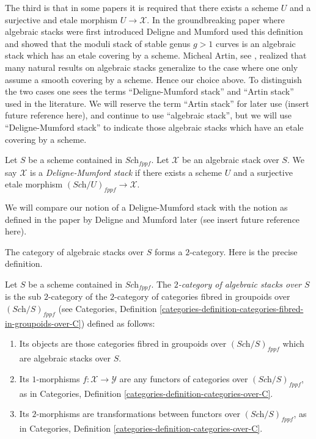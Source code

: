 \medskip\noindent
The third is that in some papers it is required that there exists a
scheme $U$ and a surjective and etale morphism $U \to \mathcal{X}$.
In the groundbreaking paper \cite{DM} where algebraic stacks were first
introduced Deligne and Mumford used this definition and showed that
the moduli stack of stable genus $g > 1$ curves is an algebraic stack 
which has an etale covering by a scheme. Micheal Artin, see
\cite{artin_versal}, realized that many
natural results on algebraic stacks generalize to the case where one
only assume a smooth covering by a scheme. Hence our choice above.
To distinguish the two cases one sees the terms ``Deligne-Mumford stack''
and ``Artin stack'' used in the literature. We will reserve the term
``Artin stack'' for later use (insert future reference here), and continue
to use ``algebraic stack'', but we will use ``Deligne-Mumford stack''
to indicate those algebraic stacks which have an etale covering by a
scheme.

\begin{definition}
\label{definition-deligne-mumford}
Let $S$ be a scheme contained in $\textit{Sch}_{fppf}$.
Let $\mathcal{X}$ be an algebraic stack over $S$.
We say $\mathcal{X}$ is a {\it Deligne-Mumford stack} if there exists
a scheme $U$ and a surjective etale morphism
$(\textit{Sch}/U)_{fppf} \to \mathcal{X}$.
\end{definition}

\noindent
We will compare our notion of a Deligne-Mumford stack with
the notion as defined in the paper by Deligne and Mumford later
(see insert future reference here).

\medskip\noindent
The category of algebraic stacks over $S$ forms a $2$-category.
Here is the precise definition.

\begin{definition}
\label{definition-morphism-algebraic-stacks}
Let $S$ be a scheme contained in $\textit{Sch}_{fppf}$.
The {\it $2$-category of algebraic stacks over $S$} is the
sub $2$-category of the $2$-category of categories fibred in
groupoids over $(\textit{Sch}/S)_{fppf}$ (see
Categories,
Definition \ref{categories-definition-categories-fibred-in-groupoids-over-C})
defined as follows:
\begin{enumerate}
\item Its objects are those categories fibred in groupoids
over $(\textit{Sch}/S)_{fppf}$ which are algebraic stacks over $S$.
\item Its $1$-morphisms $f : \mathcal{X} \to \mathcal{Y}$ are
any functors of categories over $(\textit{Sch}/S)_{fppf}$, as in
Categories, Definition \ref{categories-definition-categories-over-C}.
\item Its $2$-morphisms are transformations between functors
over $(\textit{Sch}/S)_{fppf}$, as in
Categories, Definition \ref{categories-definition-categories-over-C}.
\end{enumerate}
\end{definition}

